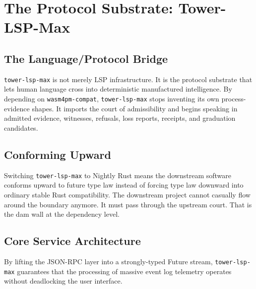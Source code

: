 
\chapter{The Protocol Substrate: Tower-LSP-Max}
\section{The Language/Protocol Bridge}
\texttt{tower-lsp-max} is not merely LSP infrastructure. It is the protocol substrate that lets human language cross into deterministic manufactured intelligence. By depending on \texttt{wasm4pm-compat}, \texttt{tower-lsp-max} stops inventing its own process-evidence shapes. It imports the court of admissibility and begins speaking in admitted evidence, witnesses, refusals, loss reports, receipts, and graduation candidates.

\section{Conforming Upward}
Switching \texttt{tower-lsp-max} to Nightly Rust means the downstream software conforms upward to future type law instead of forcing type law downward into ordinary stable Rust compatibility. The downstream project cannot casually flow around the boundary anymore. It must pass through the upstream court. That is the dam wall at the dependency level.

\section{Core Service Architecture}
By lifting the JSON-RPC layer into a strongly-typed Future stream, \texttt{tower-lsp-max} guarantees that the processing of massive event log telemetry operates without deadlocking the user interface.
